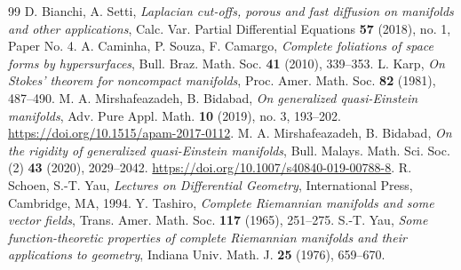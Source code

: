 \documentclass[10pt,a4paper]{amsart}
\begin{document}
\begin{thebibliography}{99}
 D. Bianchi, A. Setti, \textit{Laplacian cut-offs, porous and fast diffusion on manifolds and other applications}, Calc. Var. Partial Differential Equations \textbf{57} (2018), no. 1, Paper No. 4.
 A. Caminha, P. Souza, F. Camargo, \textit{Complete foliations of space forms by hypersurfaces}, Bull. Braz. Math. Soc. \textbf{41} (2010), 339--353.
 L. Karp, \textit{On Stokes' theorem for noncompact manifolds}, Proc. Amer. Math. Soc. \textbf{82} (1981), 487--490.
 M. A. Mirshafeazadeh, B. Bidabad, \textit{On generalized quasi-Einstein manifolds}, Adv. Pure Appl. Math. \textbf{10} (2019), no. 3, 193--202. \url{https://doi.org/10.1515/apam-2017-0112}.
 M. A. Mirshafeazadeh, B. Bidabad, \textit{On the rigidity of generalized quasi-Einstein manifolds}, Bull. Malays. Math. Sci. Soc. (2) \textbf{43} (2020), 2029--2042. \url{https://doi.org/10.1007/s40840-019-00788-8}.
 R. Schoen, S.-T. Yau, \textit{Lectures on Differential Geometry}, International Press, Cambridge, MA, 1994.
 Y. Tashiro, \textit{Complete Riemannian manifolds and some vector fields}, Trans. Amer. Math. Soc. \textbf{117} (1965), 251--275.
 S.-T. Yau, \textit{Some function-theoretic properties of complete Riemannian manifolds and their applications to geometry}, Indiana Univ. Math. J. \textbf{25} (1976), 659--670.
\end{thebibliography}
\end{document}
